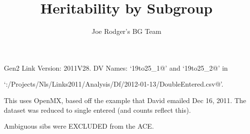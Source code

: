 \documentclass[a4paper]{article}
\title{Heritability by Subgroup}
\author{Joe Rodger's BG Team}
\begin{document}

\maketitle


Gen2 Link Version: 2011V28.  DV Names: `\verb@HtSt19to25_1@' and `\verb@HtSt19to25_2@' in

`\verb@F:/Projects/Nls/Links2011/Analysis/Df/2012-01-13/DoubleEntered.csv@'.

This uses OpenMX, based off the example that David emailed Dec 16, 2011.  The dataset was reduced to single entered (and counts reflect this).

Ambiguous sibs were EXCLUDED from the ACE.
\end{document}
